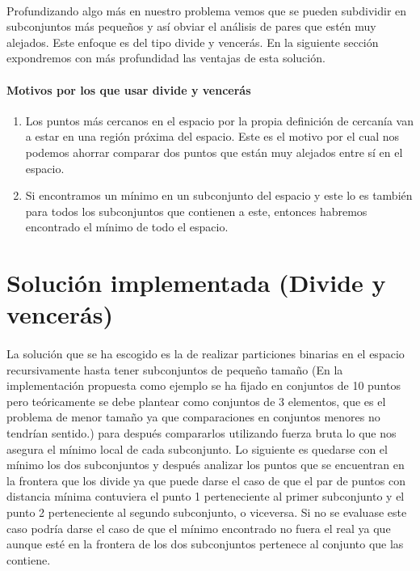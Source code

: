 \documentclass{article}
\begin{document}
	
		\paragraph{}
		Profundizando algo más en nuestro problema vemos que se pueden subdividir en subconjuntos más pequeños y así obviar el análisis de pares que estén muy alejados. Este enfoque es del tipo divide y vencerás. En la siguiente sección expondremos con más profundidad las ventajas de esta solución.

		\paragraph{Motivos por los que usar divide y vencerás}

			\begin{enumerate}

				\item
				Los puntos más cercanos en el espacio por la propia definición de cercanía van a estar en una región próxima del espacio. Este es el motivo por el cual nos podemos ahorrar comparar dos puntos que están muy alejados entre sí en el espacio.
				
				\item
				Si encontramos un mínimo en un subconjunto del espacio y este lo es también para todos los subconjuntos que contienen a este, entonces habremos encontrado el mínimo de todo el espacio.

			\end{enumerate}

\section{Solución implementada (Divide y vencerás)}

	\paragraph{}
	La solución que se ha escogido es la de realizar particiones binarias en el espacio recursivamente hasta tener subconjuntos de pequeño tamaño (En la implementación propuesta como ejemplo se ha fijado en conjuntos de 10 puntos pero teóricamente se debe plantear como conjuntos de 3 elementos, que es el problema de menor tamaño ya que comparaciones en conjuntos menores no tendrían sentido.) para después compararlos utilizando fuerza bruta lo que nos asegura el mínimo local de cada subconjunto. Lo siguiente es quedarse con el mínimo los dos subconjuntos y después analizar los puntos que se encuentran en la frontera que los divide ya que puede darse el caso de que el par de puntos con distancia mínima contuviera el punto 1 perteneciente al primer subconjunto y el punto 2 perteneciente al segundo subconjunto, o viceversa. Si no se evaluase este caso podría darse el caso de que el mínimo encontrado no fuera el real ya que aunque esté en la frontera de los dos subconjuntos pertenece al conjunto que las contiene.
\end{document}
